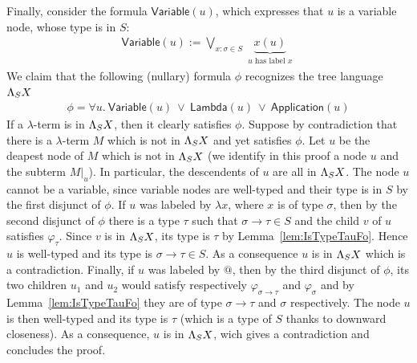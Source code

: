 Finally, consider the formula $\mathsf{Variable}(u)$, which expresses that $u$ is a variable node, whose type is in $S$:
\begin{align*}
\mathsf{Variable}(u) :=  \bigvee_{x:\sigma\in S}\underbrace{x(u)}_{\substack{\text{$u$ has label $x$}}} 
\end{align*}  
We claim that the following (nullary) formula $\phi$ recognizes the tree language $\Lambda_{S} X$
\begin{align*}
\phi = \forall u.\ \mathsf{Variable}(u)\ \vee\ \mathsf{Lambda}(u)\ \vee\  \mathsf{Application}(u)
\end{align*}
If a $\lambda$-term is in $\Lambda_{S} X$, then it clearly satisfies $\phi$. Suppose by contradiction that there is a $\lambda$-term $M$ which is not in $\Lambda_{S} X$ and yet satisfies $\phi$. Let $u$  be the deapest node of $M$ which is not in $\Lambda_{S} X$ (we identify in this proof a node $u$ and the subterm $M|_u$). In particular, the descendents of $u$ are all in $\Lambda_{S} X$. The node $u$ cannot be a variable, since variable nodes are well-typed and their type is in $S$ by the first disjunct of $\phi$.  If $u$ was labeled by $\lambda x$, where $x$ is of type $\sigma$, then by the second disjunct of $\phi$ there is a type $\tau$ such that $\sigma\rightarrow\tau\in S$ and the child $v$ of $u$  satisfies $\varphi_\tau$. Since $v$ is in $\Lambda_{S} X$, its type is $\tau$ by Lemma~\ref{lem:IsTypeTauFo}. Hence $u$ is well-typed and its type is $\sigma\rightarrow\tau\in S$. As a consequence $u$ is in $\Lambda_{S} X$ which is a contradiction.  Finally, if $u$ was labeled by $@$, then by the third disjunct of $\phi$, its two children $u_1$ and $u_2$
would satisfy respectively $\varphi_{\sigma\rightarrow\tau}$ and  $\varphi_{\sigma}$ and by Lemma~\ref{lem:IsTypeTauFo} they are of type $\sigma\rightarrow\tau$ and $\sigma$ respectively. The node $u$ is then well-typed and its type is $\tau$ (which is a type of $S$ thanks to downward closeness). As a consequence, $u$ is in $\Lambda_{S} X$, wich gives a contradiction and concludes the proof.
 \smallskip
 
